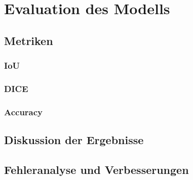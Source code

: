 \chapter{Evaluation des Modells}
\section{Metriken}
\subsection{IoU}
\subsection{DICE}
\subsection{Accuracy}
\section{Diskussion der Ergebnisse}
\section{Fehleranalyse und Verbesserungen}
